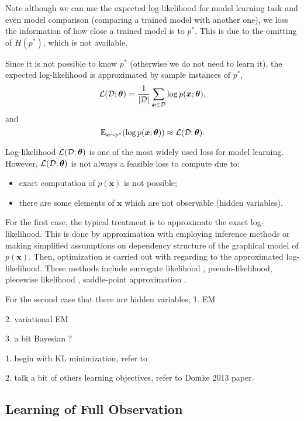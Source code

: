 Note although we can use the expected log-likelihood for model learning task and even model comparison (comparing a trained model with another one), we loss the information of how close a trained model is to $p^{\ast}$. This is due to the omitting of $H(p^{\ast})$, which is not available.

Since it is not possible to know $p^{\ast}$ (otherwise we do not need to learn it), the expected log-likelihood is approximated by sample instances of $p^{\ast}$,
\begin{equation}
  \mathcal{L}(\mathcal{D}; \bm{\theta}) = \frac{1}{| \mathcal{D} |}\sum_{\bm{x}\in \mathcal{D}}\log{p(\bm{x};\bm{\theta})},
\end{equation}
and
\begin{equation}
  \mathbb{E}_{\bm{x}\sim p^{\ast}}(\log{{p(\bm{x}; \bm{\theta})}}) \approx \mathcal{L}(\mathcal{D}; \bm{\theta}).
\end{equation}

Log-likelihood $\mathcal{L}(\mathcal{D}; \bm{\theta})$ is one of the most widely used loss for model learning. However, $\mathcal{L}(\mathcal{D}; \bm{\theta})$ is not always a feasible loss to compute due to:
\begin{itemize}
\item exact computation of $p(\bm{x})$ is not possible;
\item there are some elements of $\bm{x}$ which are not observable (hidden variables).
\end{itemize}
For the first case, the typical treatment is to approximate the exact log-likelihood. This is done by approximation with employing inference methods or   making simplified assumptions on dependency structure of the graphical model of $p(\bm{x})$. Then, optimization is carried out with regarding to the approximated log-likelihood. These methods include surrogate likelihood \cite{wainwright06estimating, lu2019blockBP}, pseudo-likelihood\cite{qu2019gmnn}, piecewise likelihood \cite{sutton2012piecewise, lin_2016_CVPR}, saddle-point approximation \cite{srikumar-etal-2012-amortizing, NIPS2019_9687}.

For the second case that there are hidden variables,
1. EM

2. variational EM

3. a bit Bayesian ?

1. begin with KL minimization, refer to \cite[chapter16]{koller2009pgm}



2. talk a bit of others learning objectives, refer to Domke 2013 paper.
\subsection{Learning of Full Observation}

